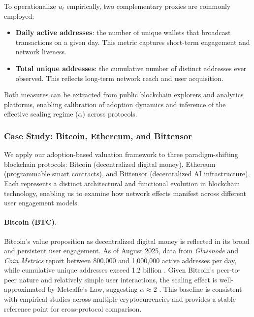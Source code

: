 \documentclass[12pt]{article}
\begin{document}
To operationalize \( u_t \) empirically, two complementary proxies are commonly employed:

\begin{itemize}
    \item \textbf{Daily active addresses}: the number of unique wallets that broadcast transactions on a given day. This metric captures short-term engagement and network liveness.
    \item \textbf{Total unique addresses}: the cumulative number of distinct addresses ever observed. This reflects long-term network reach and user acquisition.
\end{itemize}

Both measures can be extracted from public blockchain explorers and analytics platforms, enabling calibration of adoption dynamics and inference of the effective scaling regime (\( \alpha \)) across protocols.

\subsubsection{Case Study: Bitcoin, Ethereum, and Bittensor}

We apply our adoption-based valuation framework to three paradigm-shifting blockchain protocols: Bitcoin (decentralized digital money), Ethereum (programmable smart contracts), and Bittensor (decentralized AI infrastructure). Each represents a distinct architectural and functional evolution in blockchain technology, enabling us to examine how network effects manifest across different user engagement models.

\vspace{0.5em}
\paragraph{Bitcoin (BTC).} 
Bitcoin’s value proposition as decentralized digital money is reflected in its broad and persistent user engagement. As of August 2025, data from \textit{Glassnode} and \textit{Coin Metrics} report between 800{,}000 and 1{,}000{,}000 active addresses per day, while cumulative unique addresses exceed 1.2 billion \citep{glassnodeBTC,bitinfochartsBTC}. Given Bitcoin’s peer-to-peer nature and relatively simple user interactions, the scaling effect is well-approximated by Metcalfe’s Law, suggesting \( \alpha \approx 2 \) \citep{bakhtiar2023network}. This baseline is consistent with empirical studies across multiple cryptocurrencies and provides a stable reference point for cross-protocol comparison.
\end{document}

